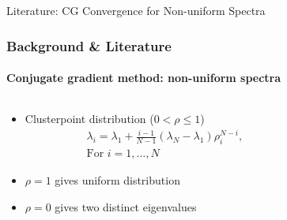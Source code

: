 \footerinfootnotestrue
\begin{frame}[label=background,fragile]{Literature: CG Convergence for Non-uniform Spectra}
    \frametitle{Background \& Literature}
    \framesubtitle{Conjugate gradient method: non-uniform spectra}
    \begin{columns}[T,onlytextwidth]
        \begin{column}{.5\textwidth}
            \begin{itemize}
                \item<1-> Clusterpoint distribution ($0 < \rho \leq 1$)\cite{cg_convrate_Strakos1991}
                \begin{align*}
                    &\lambda_i = \lambda_1 + \frac{i-1}{N-1}(\lambda_N - \lambda_1)\rho_i^{N-i}, \\ 
                    &\text{For }i = 1, \dots, N
                \end{align*}
                \item<2-> $\rho = 1$ gives uniform distribution
                \item<3-> $\rho = 0$ gives two distinct eigenvalues
            \end{itemize}
        \end{column}
        \begin{column}{.45\textwidth}
        \end{column}
    \end{columns}
\end{frame}

